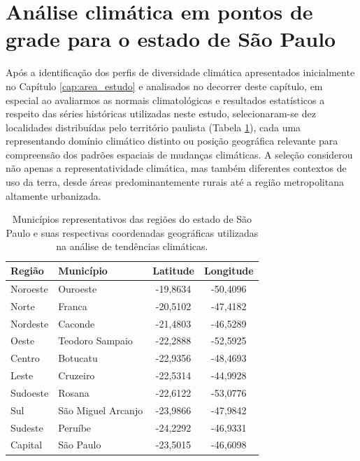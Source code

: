 \section{Análise climática em pontos de grade para o estado de São Paulo}

Após a identificação dos perfis de diversidade climática apresentados inicialmente no Capítulo \ref{cap:area_estudo} e analisados no decorrer deste capítulo, em especial ao avaliarmos as normais climatológicas e resultados estatísticos a respeito das séries históricas utilizadas neste estudo, selecionaram-se dez localidades distribuídas pelo território paulista (Tabela \ref{tab:coordenadas_sp}), cada uma representando domínio climático distinto ou posição geográfica relevante para compreensão dos padrões espaciais de mudanças climáticas. A seleção considerou não apenas a representatividade climática, mas também diferentes contextos de uso da terra, desde áreas predominantemente rurais até a região metropolitana altamente urbanizada.

\begin{table}[htbp]
	\centering
	\caption[Municípios representativos das regiões do estado de São Paulo]{Municípios representativos das regiões do estado de São Paulo e suas respectivas coordenadas geográficas utilizadas na análise de tendências climáticas.}
	\label{tab:coordenadas_sp}
	\begin{tabular}{llcc}
		\hline
		\textbf{Região} & \textbf{Município} & \textbf{Latitude} & \textbf{Longitude} \\
		\hline
        Noroeste & Ouroeste          & -19{,}8634 & -50{,}4096 \\
        Norte    & Franca            & -20{,}5102 & -47{,}4182 \\
        Nordeste & Caconde           & -21{,}4803 & -46{,}5289 \\
        Oeste    & Teodoro Sampaio   & -22{,}2888 & -52{,}5925 \\
        Centro   & Botucatu          & -22{,}9356 & -48{,}4693 \\
        Leste    & Cruzeiro          & -22{,}5314 & -44{,}9928 \\
        Sudoeste & Rosana            & -22{,}6122 & -53{,}0776 \\
        Sul      & São Miguel Arcanjo& -23{,}9866 & -47{,}9842 \\
        Sudeste  & Peruíbe           & -24{,}2292 & -46{,}9331 \\
        Capital  & São Paulo         & -23{,}5015 & -46{,}6098 \\
		\hline
	\end{tabular}
\end{table}


